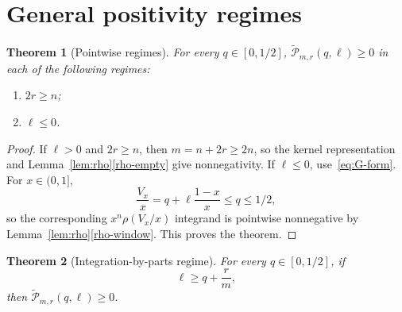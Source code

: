 \documentclass[11pt]{article}
\newtheorem{theorem}{Theorem}[section]
\newcommand{\wtP}{\widetilde{\mathcal P}}
\begin{document}
\section{General positivity regimes}\label{sec:general-pos}

\begin{theorem}[Pointwise regimes]\label{thm:pointwise}
For every $q\in[0,1/2]$, $\wtP_{m,r}(q,\ell)\ge0$ in each of the following regimes:
\begin{enumerate}[label=\textup{(\alph*)}]
\item $2r\ge n$;
\item $\ell\le0$.
\end{enumerate}
\end{theorem}

\begin{proof}
If $\ell>0$ and $2r\ge n$, then $m=n+2r\ge2n$, so the kernel representation and Lemma~\ref{lem:rho}\ref{rho-empty} give nonnegativity.  If $\ell\le0$, use~\eqref{eq:G-form}.  For $x\in(0,1]$,
\[
        \frac{V_x}{x}=q+\ell\frac{1-x}{x}\le q\le1/2,
\]
so the corresponding $x^n\rho(V_x/x)$ integrand is pointwise nonnegative by Lemma~\ref{lem:rho}\ref{rho-window}.  This proves the theorem.
\end{proof}

\begin{theorem}[Integration-by-parts regime]\label{thm:ibp}
For every $q\in[0,1/2]$, if
\[
        \ell\ge q+\frac rm,
\]
then $\wtP_{m,r}(q,\ell)\ge0$.
\end{theorem}
\end{document}
